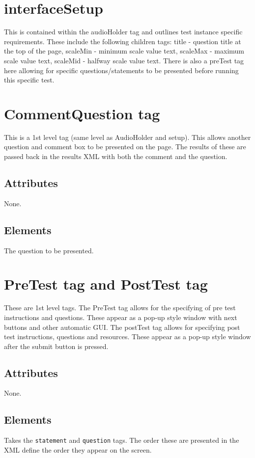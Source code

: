 \documentclass{article}
\begin{document}
\section{interfaceSetup}

This is contained within the audioHolder tag and outlines test instance specific requirements. These include the following children tags: title - question title at the top of the page, scaleMin - minimum scale value text, scaleMax - maximum scale value text, scaleMid - halfway scale value text. There is also a preTest tag here allowing for specific questions/statements to be presented before running this specific test.

\section {CommentQuestion tag}

This is a 1st level tag (same level as AudioHolder and setup). This allows another question and comment box to be presented on the page. The results of these are passed back in the results XML with both the comment and the question.

\subsection{Attributes}
None.

\subsection{Elements}
The question to be presented.

\section {PreTest tag and PostTest tag}

These are 1st level tags. The PreTest tag allows for the specifying of pre test instructions and questions. These appear as a pop-up style window with next buttons and other automatic GUI. The postTest tag allows for specifying post test instructions, questions and resources. These appear as a pop-up style window after the submit button is pressed.

\subsection{Attributes}
None.

\subsection{Elements}
Takes the \texttt{statement} and \texttt{question} tags. The order these are presented in the XML define the order they appear on the screen.
\end{document}
